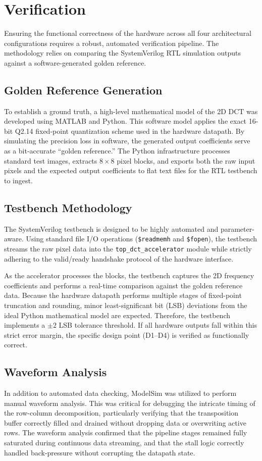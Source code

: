 \section{Verification}

Ensuring the functional correctness of the hardware across all four architectural configurations requires a robust, automated verification pipeline. The methodology relies on comparing the SystemVerilog RTL simulation outputs against a software-generated golden reference.

\subsection{Golden Reference Generation}
To establish a ground truth, a high-level mathematical model of the 2D DCT was developed using MATLAB and Python. This software model applies the exact 16-bit Q2.14 fixed-point quantization scheme used in the hardware datapath. By simulating the precision loss in software, the generated output coefficients serve as a bit-accurate ``golden reference.'' The Python infrastructure processes standard test images, extracts $8 \times 8$ pixel blocks, and exports both the raw input pixels and the expected output coefficients to flat text files for the RTL testbench to ingest.

\subsection{Testbench Methodology}
The SystemVerilog testbench is designed to be highly automated and parameter-aware. Using standard file I/O operations (\texttt{\$readmemh} and \texttt{\$fopen}), the testbench streams the raw pixel data into the \texttt{top\_dct\_accelerator} module while strictly adhering to the valid/ready handshake protocol of the hardware interface. 

As the accelerator processes the blocks, the testbench captures the 2D frequency coefficients and performs a real-time comparison against the golden reference data. Because the hardware datapath performs multiple stages of fixed-point truncation and rounding, minor least-significant bit (LSB) deviations from the ideal Python mathematical model are expected. Therefore, the testbench implements a $\pm 2$ LSB tolerance threshold. If all hardware outputs fall within this strict error margin, the specific design point (D1--D4) is verified as functionally correct.

\subsection{Waveform Analysis}
In addition to automated data checking, ModelSim was utilized to perform manual waveform analysis. This was critical for debugging the intricate timing of the row-column decomposition, particularly verifying that the transposition buffer correctly filled and drained without dropping data or overwriting active rows. The waveform analysis confirmed that the pipeline stages remained fully saturated during continuous data streaming, and that the stall logic correctly handled back-pressure without corrupting the datapath state.

